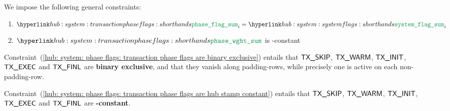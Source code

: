 We impose the following general constraints:
\begin{enumerate}
	\item \label{hub: system: phase flags: transaction phase flags are binary exclusive}   $\phaseFlagSum _{i} = \flagSum _{i}$
	\item \label{hub: system: phase flags: transaction phase flags are hub stamp constant} $\phaseWghtSum$ is \hubStamp{}-constant
\end{enumerate}
\saNote{}
Constraint~(\ref{hub: system: phase flags: transaction phase flags are binary exclusive})
entails that
$\textsf{TX}\textsf{\_SKIP}$,
$\textsf{TX}\textsf{\_WARM}$,
$\textsf{TX}\textsf{\_INIT}$,
$\textsf{TX}\textsf{\_EXEC}$ and
$\textsf{TX}\textsf{\_FINL}$
are \textbf{binary exclusive}, and that they vanish along padding-rows,
while precisely one is active on each non-padding-row.

\saNote{}
Constraint~(\ref{hub: system: phase flags: transaction phase flags are hub stamp constant})
entails that
$\textsf{TX}\textsf{\_SKIP}$,
$\textsf{TX}\textsf{\_WARM}$,
$\textsf{TX}\textsf{\_INIT}$,
$\textsf{TX}\textsf{\_EXEC}$ and
$\textsf{TX}\textsf{\_FINL}$
are \textbf{\hubStamp-constant}.
